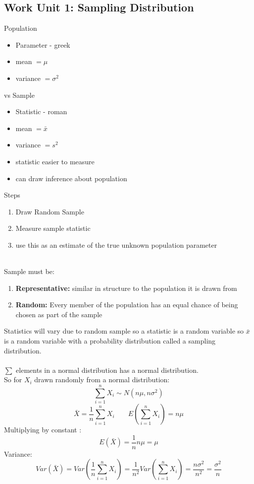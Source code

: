\documentclass[a4paper,10pt]{article}
\begin{document}
\subsection{Work Unit 1: Sampling Distribution}
Population
\begin{itemize}
	\item Parameter - greek
	\item mean $= \mu$
	\item variance $= \sigma^2$
\end{itemize}
vs Sample
\begin{itemize}
	\item Statistic - roman
	\item mean $= \bar{x}$
	\item variance $= s^2$
	\item statistic easier to measure
	\item can draw inference about population
\end{itemize}
Steps
\begin{enumerate}
	\item Draw Random Sample
	\item Measure sample statistic
	\item use this as an estimate of the true unknown population parameter
\end{enumerate}
\\
Sample must be:
\begin{enumerate}
	\item \textbf{Representative: } similar in structure to the population it is drawn from
	\item \textbf{Random: } Every member of the population has an equal chance of being chosen as part of the sample
\end{enumerate}
Statistics will vary due to random sample so a statistic is a random variable
so $\bar{x}$ is a random variable with a probability distribution called a sampling distribution. \\ \\
$\sum$ elements in a normal distribution has a normal distribution. \\ So for $X_i$ drawn randomly from a normal distribution:
\[
	\sum_{i = 1}^nX_i \sim N(n\mu, n\sigma^2)
\]
\[
	\bar{X} = \frac{1}{n}\sum_{i = 1}^nX_i \;\;\;\;\;\;\; E(\sum_{i = 1}^nX_i ) = n\mu
\]
Multiplying by constant :
\[
	E(\bar{X}) = \frac{1}{n}n\mu = \mu
\]
Variance:
\[
	Var(\bar{X}) = Var(\frac{1}{n}\sum_{i = 1}^nX_i) = \frac{1}{n^2}Var(\sum_{i = 1}^nX_i) = \frac{n\sigma^2}{n^2} = \frac{\sigma^2}{n}
\]
\end{document}

